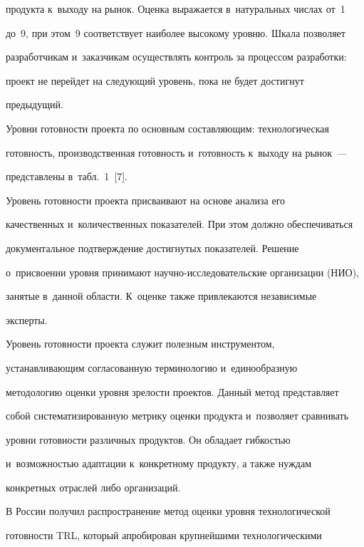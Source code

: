 продукта к~выходу на рынок. Оценка выражается в~натуральных числах от~1 

до~9, при этом~9 соответствует наиболее высокому уровню. Шкала позволяет 

разработчикам и~заказчикам осуществлять контроль за процессом разработки: 

проект не перейдет на следующий уровень, пока не будет достигнут 

предыдущий.

  

  Уровни готовности проекта по основным составляющим: технологическая 

готовность, производственная готовность и~готовность к~выходу на рынок~--- 

представлены в~табл.~1~[7].

  

  Уровень готовности проекта присваивают на основе анализа его 

качественных и~количественных показателей. При этом должно обеспечиваться 

документальное подтверждение достигнутых показателей. Решение 

о~присвоении уровня принимают научно-исследовательские организации (НИО), 

занятые в~данной области. К~оценке также привлекаются независимые 

эксперты. 

  

  Уровень готовности проекта служит полезным инструментом, 

уста\-нав\-ли\-ва\-ющим согласованную терминологию и~единообразную 

методологию оценки уровня зрелости проектов. Данный метод представляет 

собой систематизированную метрику оценки продукта и~позволяет сравнивать 

уровни готовности различных продуктов. Он обладает гибкостью 

и~возможностью адаптации к~конкретному продукту, а также нуждам 

конкретных отраслей либо организаций. 

  

  





  В России получил распространение метод оценки уровня технологической 

готовности TRL, который апробирован крупнейшими технологическими 


